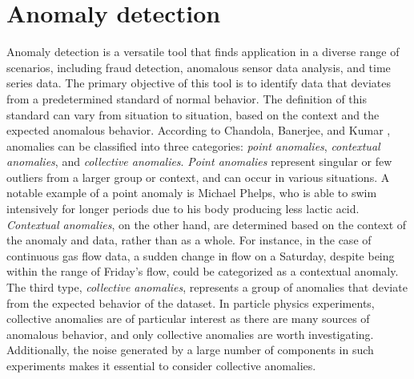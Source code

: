 \section{Anomaly detection}
Anomaly detection is a versatile tool that finds application in a diverse range of scenarios, 
including fraud detection, anomalous sensor data analysis, and time series data. The primary 
objective of this tool is to identify data that deviates from a predetermined standard of 
normal behavior. The definition of this standard can vary from situation to situation, based 
on the context and the expected anomalous behavior. According to Chandola, Banerjee, and 
Kumar \cite{anom_detec}, anomalies can be classified into three categories: \textit{point anomalies}, 
\textit{contextual anomalies}, and \textit{collective anomalies}. \textit{Point anomalies} represent singular or few 
outliers from a larger group or context, and can occur in various situations. A notable example 
of a point anomaly is Michael Phelps, who is able to swim intensively for longer periods due 
to his body producing less lactic acid. \textit{Contextual anomalies}, on the other hand, are determined 
based on the context of the anomaly and data, rather than as a whole. For instance, in the 
case of continuous gas flow data, a sudden change in flow on a Saturday, despite being within 
the range of Friday's flow, could be categorized as a contextual anomaly. The third type, 
\textit{collective anomalies}, represents a group of anomalies that deviate from the expected behavior 
of the dataset. In particle physics experiments, collective anomalies are of particular 
interest as there are many sources of anomalous behavior, and only collective anomalies are 
worth investigating. Additionally, the noise generated by a large number of components in such 
experiments makes it essential to consider collective anomalies.

